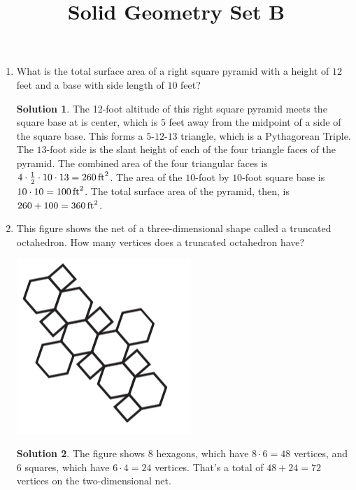 \documentclass{article}
\title{Solid Geometry Set B}
\author{}
\date{}
\theoremstyle{definition}
\newtheorem*{solution}{Solution}
\begin{document}
\maketitle
\begin{multicols}{2}
    \begin{enumerate}
        \item What is the total surface area of a right square pyramid with a height of $12$ feet and a base with side length of $10$ feet?
            \begin{solution}
                The 12-foot altitude of this right square pyramid meets the square base at is center, which is $5$ feet away from the midpoint of a side of the square base.
                This forms a $5$-$12$-$13$ triangle, which is a Pythagorean Triple. The $13$-foot side is the slant height of each of the four triangle faces of the pyramid.
                The combined area of the four triangular faces is $4 \cdot \frac{1}{2} \cdot 10 \cdot 13 = \SI{260}{ft\squared}$.
                The area of the $10$-foot by $10$-foot square base is $10 \cdot 10 = \SI{100}{ft\squared}$.
                The total surface area of the pyramid, then, is $260 + 100 = \SI{360}{ft\squared}$.
            \end{solution}
        \item This figure shows the net of a three-dimensional shape called a truncated octahedron.
            How many vertices does a truncated octahedron have?
            \begin{center}
                \includegraphics[scale=0.4]{truncated_octahedron.png}
            \end{center}
            \begin{solution}
                The figure shows $8$ hexagons, which have $8 \cdot 6 = 48$ vertices, and $6$ squares, which have $6 \cdot 4 = 24$ vertices.
                That's a total of $48 + 24 = 72$ vertices on the two-dimensional net.

\end{solution}
\end{enumerate}
\end{multicols}
\end{document}
